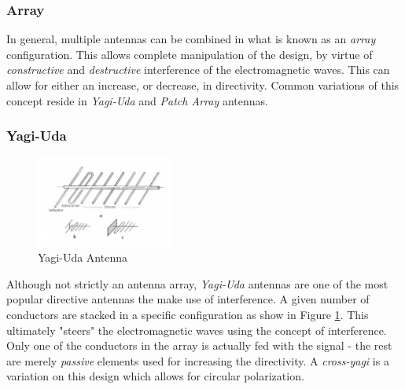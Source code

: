 \subsubsection{Array}
In general, multiple antennas can be combined in what is known as an \textit{array} configuration. This allows complete manipulation of the design, by virtue of \textit{constructive} and \textit{destructive} interference of the electromagnetic waves. This can allow for either an increase, or decrease, in directivity. Common variations of this concept reside in \textit{Yagi-Uda} and \textit{Patch Array} antennas. \cite{site-antennaTheory}

\subsubsection{Yagi-Uda}
\begin{figure}[!htb]
  \centering
  \includegraphics[width=0.4\textwidth]{yagi}
  \caption{Yagi-Uda Antenna \cite{site-icantennasYagi}}
  \label{fig:yagi}
\end{figure}
Although not strictly an antenna array, \textit{Yagi-Uda} antennas are one of the most popular directive antennas the make use of interference. A given number of conductors are stacked in a specific configuration as show in  Figure \ref{fig:yagi}. This ultimately "steers" the electromagnetic waves using the concept of interference. Only one of the conductors in the array is actually fed with the signal - the rest are merely \textit{passive} elements used for increasing the directivity. A \textit{cross-yagi} is a variation on this design which allows for circular polarization.

